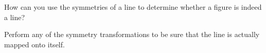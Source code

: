 \documentclass[nooutcomes]{ximera}
\begin{document}
\begin{question}
How can you use the symmetries of a line to determine whether a figure is indeed a line? 
\begin{freeResponse}
\end{freeResponse}
\begin{hint}
Perform any of the symmetry transformations to be sure that the line is actually mapped onto itself.  
\end{hint}
\end{question}

\end{document}
